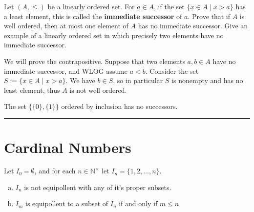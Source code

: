 \begin{exercise}
    Let $(A,\le)$ be a linearly ordered set. For $a\in A$, if the set $\{x\in A\mid x > a\}$ has a least element, this is called the \textbf{immediate successor} of $a$. Prove that if $A$ is well ordered, then at most one element of $A$ has no immediate successor. Give an example of a linearly ordered set in which precisely two elements have no immediate successor.
\end{exercise}
\begin{solution}
    We will prove the contrapositive. Suppose that two elements $a,b\in A$ have no immediate successor, and WLOG assume $a < b$. Consider the set $S := \{x\in A\mid x > a\}$. We have $b\in S$, so in particular $S$ is nonempty and has no least element, thus $A$ is not well ordered.

    The set $\{\{0\},\{1\}\}$ ordered by inclusion has no successors.
\end{solution}
\hrule

\pagebreak
\section{Cardinal Numbers}

\begin{exercise}
    Let $I_0 = \emptyset$, and for each $n\in\mathbb{N}^\times$ let $I_n = \{1,2,\dots,n\}$.
    \begin{enumerate}[(a)]
        \item $I_n$ is not equipollent with any of it's proper subsets.
        \item $I_m$ is equipollent to a subset of $I_n$ if and only if $m \le n$
    \end{enumerate}
\end{exercise}


